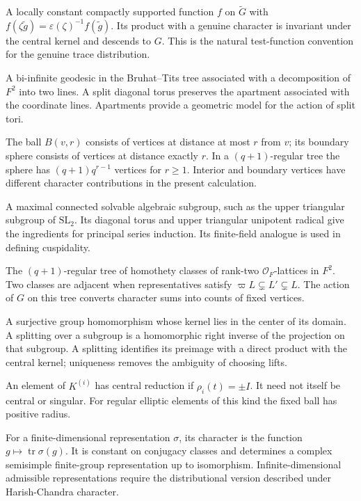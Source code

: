 \documentclass[12pt, letterpaper]{article}
\numberwithin{equation}{section}
\theoremstyle{definition}
\theoremstyle{remark}
\newcommand{\OO}{\mathcal{O}_F}
\newcommand{\wtG}{\widetilde{G}}
\newcommand{\tr}{\operatorname{tr}}
\begin{document}
\begin{description}[style=nextline,leftmargin=1.5em,itemsep=5pt]
 \item[Anti-genuine test function] A locally constant compactly supported function $f$ on $\wtG$ with $f(\zeta\widetilde g)=\varepsilon(\zeta)^{-1}f(\widetilde g)$. Its product with a genuine character is invariant under the central kernel and descends to $G$. This is the natural test-function convention for the genuine trace distribution.
 \item[Apartment] A bi-infinite geodesic in the Bruhat--Tits tree associated with a decomposition of $F^2$ into two lines. A split diagonal torus preserves the apartment associated with the coordinate lines. Apartments provide a geometric model for the action of split tori.
 \item[Ball and sphere] The ball $B(v,r)$ consists of vertices at distance at most $r$ from $v$; its boundary sphere consists of vertices at distance exactly $r$. In a $(q+1)$-regular tree the sphere has $(q+1)q^{r-1}$ vertices for $r\ge1$. Interior and boundary vertices have different character contributions in the present calculation.
 \item[Borel subgroup] A maximal connected solvable algebraic subgroup, such as the upper triangular subgroup of $\mathrm{SL}_2$. Its diagonal torus and upper triangular unipotent radical give the ingredients for principal series induction. Its finite-field analogue is used in defining cuspidality.
 \item[Bruhat--Tits tree ($mathscr{B}$)] The $(q+1)$-regular tree of homothety classes of rank-two $\OO$-lattices in $F^2$. Two classes are adjacent when representatives satisfy $\varpi L\subsetneq L'\subsetneq L$. The action of $G$ on this tree converts character sums into counts of fixed vertices.
 \item[Central extension and splitting] A surjective group homomorphism whose kernel lies in the center of its domain. A splitting over a subgroup is a homomorphic right inverse of the projection on that subgroup. A splitting identifies its preimage with a direct product with the central kernel; uniqueness removes the ambiguity of choosing lifts.
 \item[Central reduction] An element of $K^{(i)}$ has central reduction if $\rho_i(t)=\pm I$. It need not itself be central or singular. For regular elliptic elements of this kind the fixed ball has positive radius.
 \item[Character of a representation] For a finite-dimensional representation $\sigma$, its character is the function $g\mapsto\tr\sigma(g)$. It is constant on conjugacy classes and determines a complex semisimple finite-group representation up to isomorphism. Infinite-dimensional admissible representations require the distributional version described under Harish-Chandra character.

\end{description}
\end{document}
